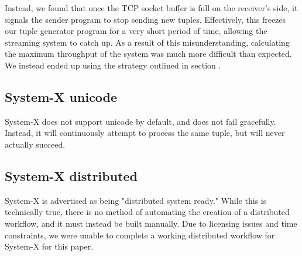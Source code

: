 Instead, we found that once the TCP socket buffer is full on the receiver's side, it signals the sender program to stop sending new tuples.  Effectively, this freezes our tuple generator program for a very short period of time, allowing the streaming system to catch up.  As a result of this misunderstanding, calculating the maximum throughput of the system was much more difficult than expected.  We instead ended up using the strategy outlined in section .

\subsection{System-X unicode}
System-X does not support unicode by default, and does not fail gracefully.  Instead, it will continuously attempt to process the same tuple, but will never actually succeed.

\subsection{System-X distributed}
System-X is advertised as being "distributed system ready."  While this is technically true, there is no method of automating the creation of a distributed workflow, and it must instead be built manually.  Due to licensing issues and time constraints, we were unable to complete a working distributed workflow for System-X for this paper.